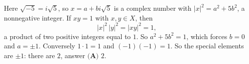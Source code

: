 Here $\sqrt{-5}=i\sqrt5$, so $x=a+bi\sqrt5$ is a complex number with $|x|^2=a^2+5b^2$, a nonnegative integer. If $xy=1$ with $x,y\in X$, then
\[|x|^2\,|y|^2=|xy|^2=1,\]
a product of two positive integers equal to $1$. So $a^2+5b^2=1$, which forces $b=0$ and $a=\pm1$. Conversely $1\cdot1=1$ and $(-1)(-1)=1$. So the special elements are $\pm1$: there are $2$, answer $\boxed{\textbf{(A) } 2}$.
